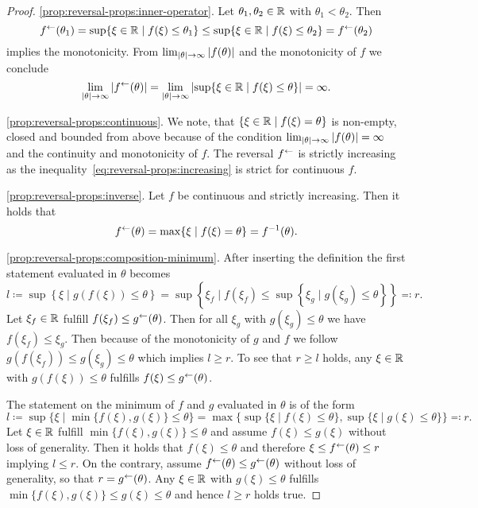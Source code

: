 \begin{proof}
    \ref{prop:reversal-props:inner-operator}. 
    Let $\theta_1, \theta_2\in\mathbb{R}$ with $\theta_1 < \theta_2$.
    Then \begin{equation}\label{eq:reversal-props:increasing}
        f^{\leftarrow}(\theta_1) = \sup\{\xi\in\mathbb{R} \mid f(\xi) \leq \theta_1 \}
        \leq \sup\{\xi\in\mathbb{R} \mid f(\xi)\leq \theta_2 \} = f^{\leftarrow}(\theta_2)
    \end{equation}
    implies the monotonicity.
    From $\lim_{\left| \theta \right|\rightarrow \infty} \left| f(\theta) \right|$ and the monotonicity of $f$ we conclude \[
        \lim_{\left| \theta \right|\rightarrow \infty} \left| f^{\leftarrow}(\theta) \right|
        = \lim_{\left| \theta \right|\rightarrow \infty} \left|  \sup\{\xi\in\mathbb{R} \mid f(\xi)\leq \theta \}  \right| = \infty.
    \]

    \ref{prop:reversal-props:continuous}.
    We note, that $\{ \xi\in\mathbb{R} \mid f(\xi) = \theta \}$ is non-empty, closed and bounded from above because of the condition $\lim_{\left| \theta \right|\rightarrow \infty} \left| f(\theta) \right| = \infty$ and the continuity and monotonicity of $f$.
    The reversal $f^{\leftarrow}$ is strictly increasing as the inequality~\eqref{eq:reversal-props:increasing} is strict for continuous $f$.
    
    \ref{prop:reversal-props:inverse}.
    Let $f$ be continuous and strictly increasing.
    Then it holds that 
    \[
        f^{\leftarrow}(\theta) = \max\{\xi\mid f(\xi) = \theta \} = f^{-1}(\theta).
    \]

    \ref{prop:reversal-props:composition-minimum}.
    After inserting the definition the first statement evaluated in $\theta$ becomes
    \[
        l\coloneqq \sup\left\{
            \xi \mid g(f(\xi)) \leq \theta
        \right\}
        =
        \sup\left\{
            \xi_f \mid f(\xi_f) \leq
            \sup\left\{ \xi_g \mid g(\xi_g) \leq \theta \right\}
            \right\}
         \eqqcolon r.
    \]
    Let $\xi_f\in\mathbb{R}$ fulfill $f(\xi_f) \leq g^{\leftarrow}(\theta)$.
    Then for all $\xi_g$ with $g(\xi_g) \leq \theta$ we have $f(\xi_f) \leq \xi_g$.
    Then because of the monotonicity of $g$ and $f$ we follow $g(f(\xi_f)) \leq g(\xi_g) \leq \theta$ which implies $l \geq r$.
    To see that $r\geq l$ holds, any $\xi\in\mathbb{R}$ with $g(f(\xi)) \leq \theta$ fulfills $f(\xi)\leq g^{\leftarrow}(\theta)$.

    The statement on the minimum of $f$ and $g$ evaluated in $\theta$ is of the form
    \[
        l\coloneqq \sup\{\xi \mid \min\{f(\xi),g(\xi)\} \leq \theta \}
        =
        \max\{
            \sup\{\xi \mid f(\xi)\leq \theta \},
            \sup\{\xi\mid g(\xi)\leq\theta\}
        \} \eqqcolon r.
    \]
    Let $\xi\in\mathbb{R}$ fulfill $\min\{f(\xi),g(\xi)\}\leq \theta$ and assume $f(\xi)\leq g(\xi)$ without loss of generality.
    Then it holds that $f(\xi) \leq \theta$ and therefore $\xi \leq f^{\leftarrow}(\theta)\leq r$ implying $l\leq r$.
    On the contrary, assume $f^{\leftarrow}(\theta)\leq g^{\leftarrow}(\theta)$ without loss of generality, so that $r = g^{\leftarrow}(\theta)$.
    Any $\xi\in\mathbb{R}$ with $g(\xi)\leq \theta$ fulfills $\min\{f(\xi),g(\xi)\}\leq g(\xi)\leq\theta$ and hence $l \geq r$ holds true.
\end{proof}

